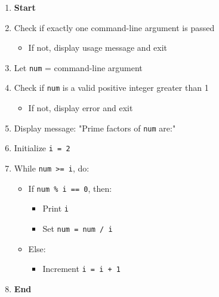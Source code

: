 \begin{enumerate}
    \item \textbf{Start}
    \item Check if exactly one command-line argument is passed
    \begin{itemize}
        \item If not, display usage message and exit
    \end{itemize}
    \item Let \texttt{num} = command-line argument
    \item Check if \texttt{num} is a valid positive integer greater than 1
    \begin{itemize}
        \item If not, display error and exit
    \end{itemize}
    \item Display message: "Prime factors of \texttt{num} are:"
    \item Initialize \texttt{i = 2}
    \item While \texttt{num >= i}, do:
    \begin{itemize}
        \item If \texttt{num \% i == 0}, then:
        \begin{itemize}
            \item Print \texttt{i}
            \item Set \texttt{num = num / i}
        \end{itemize}
        \item Else:
        \begin{itemize}
            \item Increment \texttt{i = i + 1}
        \end{itemize}
    \end{itemize}
    \item \textbf{End}
\end{enumerate}
